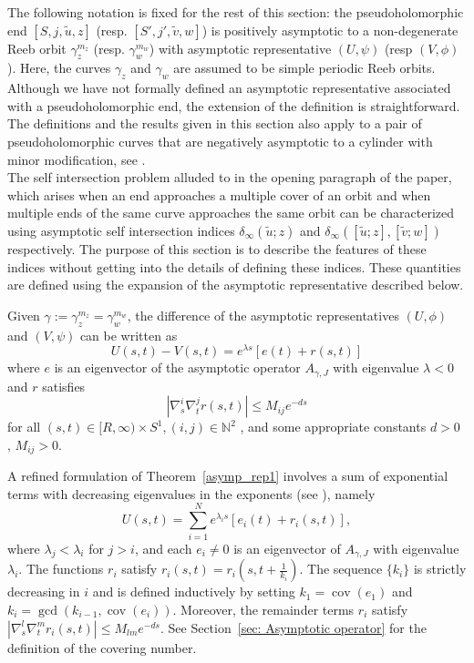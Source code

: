 \documentclass[11pt, a4paper]{amsart}
\begin{document}
The following notation is fixed for the rest of this section: the pseudoholomorphic end $[S,j,\tilde{u},z]$ (resp. $[S',j',\tilde{v},w]$) is positively asymptotic to a non-degenerate Reeb orbit $\gamma_z^{m_z}$ (resp. $\gamma_w^{m_w}$) with asymptotic representative $(U, \psi)$ (resp $(V, \phi)$). Here, the curves \(\gamma_z\) and \(\gamma_w\) are assumed to be simple periodic Reeb orbits. Although we have not formally defined an asymptotic representative associated with a pseudoholomorphic end, the extension of the definition is straightforward. The definitions and the results given in this section also apply to a pair of pseudoholomorphic curves that are negatively asymptotic to a cylinder with minor modification, see \cite{Siefinter2009,Wendlcontact3mani2020}.\\


The self intersection problem alluded to in the opening paragraph of the paper, which arises when an end approaches a multiple cover of an orbit and when multiple ends of the same curve approaches the same orbit can be characterized using asymptotic self intersection indices $\delta_{\infty}(\tilde{u}; z)$ and $\delta_{\infty}([\tilde{u}; z], [\tilde{v}; w])$ respectively. The purpose of this section is to describe the features of these indices without getting into the details of defining these indices. These quantities are defined using the expansion of the asymptotic representative described below.\\


\begin{theorem}\label{asymp_rep1}\cite[Theorem~2.2]{Siefinter2008}
Given $\gamma:=\gamma_z^{m_z}=\gamma_w^{m_w}$, the difference of the asymptotic representatives $(U,\phi)$ and $(V,\psi)$ can be written as
$$U(s, t)- V(s, t) = e ^{\lambda s} \left[e(t) + r(s, t)\right]$$
where $e$ is an eigenvector of the asymptotic operator $A_{\gamma,J}$ with eigenvalue $\lambda < 0$ and $r$ satisfies
$$|\nabla^i_s \nabla^j_t r(s, t)| \leq M_{ij} e^{-ds}$$
for all $(s, t) \in [R, \infty ) \times S^1 , (i, j) \in \mathbb{N}^{2}$ , and some appropriate constants $d > 0$ , $M_{ij} > 0$.
\end{theorem}

A refined formulation of Theorem~\ref{asymp_rep1} involves a sum of exponential terms with decreasing eigenvalues in the exponents (see \cite[Theorem~2.3]{Siefinter2008}), namely
\begin{equation}\label{asymp_rep2}
    U(s,t) = \sum_{i=1}^N e^{\lambda_i s} \left[e_i(t) + r_i(s,t)\right],
\end{equation}
where $\lambda_j < \lambda_i$ for $j > i$, and each $e_i \neq 0$ is an eigenvector of $A_{\gamma,J}$ with eigenvalue $\lambda_i$. The functions $r_i$ satisfy $r_i(s,t) = r_i\!\left(s, t + \tfrac{1}{k_i}\right)$.
The sequence $\{k_i\}$ is strictly decreasing in $i$ and is defined inductively by setting $k_1 = \operatorname{cov}(e_1)$ and $k_i = \gcd(k_{i-1}, \operatorname{cov}(e_i))$. Moreover, the remainder terms $r_i$ satisfy $\left|\nabla_s^l \nabla_t^m r_i(s,t)\right| \leq M_{lm} e^{-ds}$.
See Section~\ref{sec: Asymptotic operator} for the definition of the covering number. 
\end{document}

